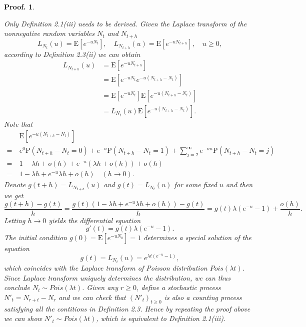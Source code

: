 \documentclass{article}
\theoremstyle{nonumberplain}
\newtheorem{Proof}{Proof.}
\begin{document}
\begin{Proof}
\begin{itemize}
	Only Definition 2.1(iii) needs to be derived. Given the Laplace transform of the nonnegative random variables $N_t$ and $N_{t+h}$
	\[
	L_{N_t}(u)=\mathrm{E}[e^{-uN_t}],\quad
	L_{N_{t+h}}(u)=\mathrm{E}[e^{-uN_{t+h}}],\quad u\ge0,
	\]
	according to Definition 2.3(ii) we can obtain
	\begin{align*}
	L_{N_{t+h}}(u)&=\mathrm{E}[e^{-uN_{t+h}}]\\
	&=\mathrm{E}[e^{-uN_{t}}e^{-u(N_{t+h}-N_t)}]\\
	&=\mathrm{E}[e^{-uN_{t}}]\mathrm{E}[e^{-u(N_{t+h}-N_t)}]\\
	&=L_{N_t}(u)\mathrm{E}[e^{-u(N_{t+h}-N_t)}].
	\end{align*}
	Note that 
	\begin{align*}
	&\mathrm{E}[e^{-u(N_{t+h}-N_t)}]\\
	=\ &e^{0}\mathrm{P}(N_{t+h}-N_t=0)+e^{-u}\mathrm{P}(N_{t+h}-N_t=1)+\sum_{j=2}^{\infty}e^{-un}\mathrm{P}(N_{t+h}-N_t=j)\\
	=\ &1-\lambda h+o(h)+e^{-u}(\lambda h+o(h))+o(h)\\
	=\ &1-\lambda h+e^{-u}\lambda h+o(h)\quad(h\to 0).
	\end{align*}
	Denote $g(t+h)=L_{N_{t+h}}(u)$ and $g(t)=L_{N_{t}}(u)$ for some fixed $u$ and then we get 
	\[
	\frac{g(t+h)-g(t)}{h}=\frac{g(t)(1-\lambda h+e^{-u}\lambda h+o(h))-g(t)}{h}=g(t)\lambda (e^{-u}-1)+\frac{o(h)}{h}.
	\]
	Letting $h\to 0$ yields the differential equation
	\[
	g'(t)=g(t)\lambda (e^{-u}-1).
	\]
	The initial condition $g(0)=\mathrm{E}[e^{-uN_{0}}]=1$ determines a special solution of the equation 
	$$g(t)=L_{N_{t}}(u)=e^{\lambda t (e^{-u}-1)},$$
	which coincides with the Laplace transform of Poisson distribution $Pois(\lambda t)$. Since Laplace transform uniquely determines the distribution, we can thus conclude $N_{t}\sim Pois(\lambda t)$. Given any $r\ge 0$, define a stochastic process $N'_t=N_{r+t}-N_r$ and we can check that $(N'_t)_{t\ge 0}$ is also a counting process satisfying all the contitions in Definition 2.3. Hence by repeating the proof above we can show $N'_{t}\sim Pois(\lambda t)$, which is equivalent to Definition 2.1(iii).


\end{itemize}
\end{Proof}
\end{document}
